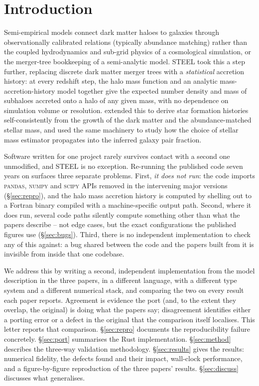 \documentclass[fleqn,usenatbib]{mnras}
\begin{document}
\section{Introduction}
\label{sec:intro}

Semi-empirical models connect dark matter haloes to galaxies through
observationally calibrated relations (typically abundance matching)
rather than the coupled hydrodynamics and sub-grid physics of a
cosmological simulation, or the merger-tree bookkeeping of a
semi-analytic model. STEEL \citep{Grylls2019a} took this a step further,
replacing discrete dark matter merger trees with a \emph{statistical}
accretion history: at every redshift step, the halo mass function and an
analytic mass-accretion-history model together give the expected number
density and mass of subhaloes accreted onto a halo of any given mass, with
no dependence on simulation volume or resolution. \citet{Grylls2020}
extended this to derive star formation histories self-consistently from
the growth of the dark matter and the abundance-matched stellar mass, and
\citet{Grylls2020b} used the same machinery to study how the choice of
stellar mass estimator propagates into the inferred galaxy pair fraction.

Software written for one project rarely survives contact with a second
one unmodified, and STEEL is no exception. Re-running the published code
seven years on surfaces three separate problems. First, \emph{it does not
run}: the code imports \textsc{pandas}, \textsc{numpy} and \textsc{scipy}
APIs removed in the intervening major versions (\S\ref{sec:repro}), and the
halo mass accretion history is computed by shelling out to a Fortran
binary compiled with a machine-specific output path. Second, where it
does run, several code paths silently compute something other than what
the papers describe -- not edge cases, but the exact configurations the
published figures use (\S\ref{sec:bugs}). Third, there is no independent
implementation to check any of this against: a bug shared between the
code and the papers built from it is invisible from inside that one
codebase.

We address this by writing a second, independent implementation from the
model description in the three papers, in a different language, with a
different type system and a different numerical stack, and comparing the
two on every result each paper reports. Agreement is evidence the port
(and, to the extent they overlap, the original) is doing what the papers
say; disagreement identifies either a porting error or a defect in the
original that the comparison itself localises. This letter reports that
comparison. \S\ref{sec:repro} documents the reproducibility failure
concretely. \S\ref{sec:port} summarises the Rust implementation.
\S\ref{sec:method} describes the three-way validation methodology.
\S\ref{sec:results} gives the results: numerical fidelity, the defects
found and their impact, wall-clock performance, and a figure-by-figure
reproduction of the three papers' results. \S\ref{sec:discuss} discusses
what generalises.
\end{document}
